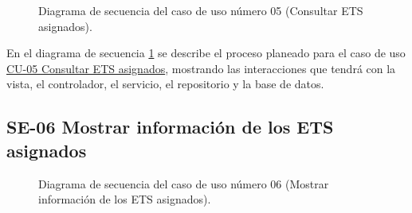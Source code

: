 \begin{figure}[htbp!]
	\begin{center}
		\caption{Diagrama de secuencia del caso de uso número 05 (Consultar ETS asignados).}
		\label{fig:Diagrama de secuencia CU-05}
	\end{center}
\end{figure}

En el diagrama de secuencia \ref{fig:Diagrama de secuencia CU-05} se describe el proceso planeado para el caso de uso \hyperlink{CU-05}{CU-05 Consultar ETS asignados}, mostrando las interacciones que tendrá con la vista, el controlador, el servicio, el repositorio y la base de datos.

\newpage

\subsection{SE-06 Mostrar información de los ETS asignados}

\begin{figure}[htbp!]
	\begin{center}
		\caption{Diagrama de secuencia del caso de uso número 06 (Mostrar información de los ETS asignados).}
		\label{fig:Diagrama de secuencia CU-06}
	\end{center}
\end{figure}

